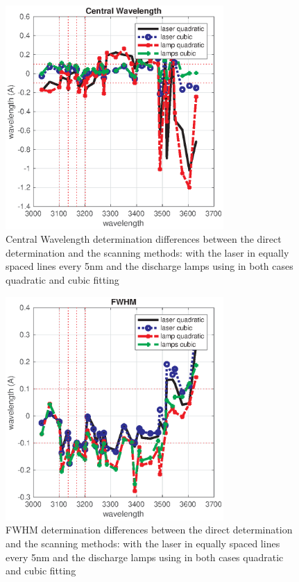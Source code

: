 \documentclass[acp]{copernicus} %
\begin{document}
\begin{figure}[t]
\includegraphics[width=8.3cm]{figures/General_central_comparison.eps}
\caption{ Central Wavelength determination differences between the direct determination and the scanning methods: with the laser in equally spaced lines every 5nm and the discharge lamps using in both cases quadratic and cubic fitting}
\label{fig:cw_comp}
\end{figure}

\begin{figure}[t]
\includegraphics[width=8.3cm]{figures/General_fwhm_comparison.eps}
\caption{ FWHM determination differences between the direct determination and the scanning methods: with the laser in equally spaced lines every 5nm and the discharge lamps using in both cases quadratic and cubic fitting}
\label{fig:fwhm_comp}
\end{figure}
\end{document}
